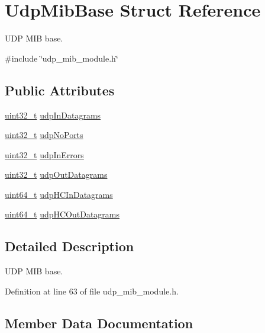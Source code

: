 \hypertarget{structUdpMibBase}{}\section{Udp\+Mib\+Base Struct Reference}
\label{structUdpMibBase}


U\+DP M\+IB base.  




{\ttfamily \#include \char`\"{}udp\+\_\+mib\+\_\+module.\+h\char`\"{}}

\subsection*{Public Attributes}
\begin{DoxyCompactItemize}
\item 
\hyperlink{stdint_8h_a435d1572bf3f880d55459d9805097f62}{uint32\+\_\+t} \hyperlink{structUdpMibBase_ae287eb0668fa213e85f26f5045cce96b}{udp\+In\+Datagrams}
\item 
\hyperlink{stdint_8h_a435d1572bf3f880d55459d9805097f62}{uint32\+\_\+t} \hyperlink{structUdpMibBase_a10dde211613021637519b666d9c06834}{udp\+No\+Ports}
\item 
\hyperlink{stdint_8h_a435d1572bf3f880d55459d9805097f62}{uint32\+\_\+t} \hyperlink{structUdpMibBase_adcfaf49489019be57bf31db1b89f8dfa}{udp\+In\+Errors}
\item 
\hyperlink{stdint_8h_a435d1572bf3f880d55459d9805097f62}{uint32\+\_\+t} \hyperlink{structUdpMibBase_a9d25a778c0594872a0961d3b40de78b8}{udp\+Out\+Datagrams}
\item 
\hyperlink{stdint_8h_aec6fcb673ff035718c238c8c9d544c47}{uint64\+\_\+t} \hyperlink{structUdpMibBase_ac97a4fa86a3f958ecabc5a28bea30f67}{udp\+H\+C\+In\+Datagrams}
\item 
\hyperlink{stdint_8h_aec6fcb673ff035718c238c8c9d544c47}{uint64\+\_\+t} \hyperlink{structUdpMibBase_acd678f88448b8d079599835c2e5d07d9}{udp\+H\+C\+Out\+Datagrams}
\end{DoxyCompactItemize}


\subsection{Detailed Description}
U\+DP M\+IB base. 

Definition at line 63 of file udp\+\_\+mib\+\_\+module.\+h.



\subsection{Member Data Documentation}
\mbox{\label{structUdpMibBase_ac97a4fa86a3f958ecabc5a28bea30f67}} 
